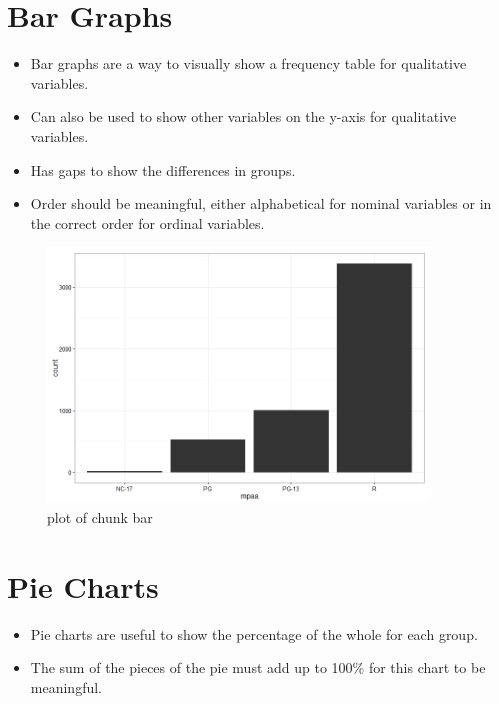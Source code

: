 \documentclass[12pt]{article}
\begin{document}
\section{Bar Graphs}\label{bar-graphs}

\begin{itemize}
\itemsep1pt\parskip0pt
\item
  Bar graphs are a way to visually show a frequency table for
  qualitative variables.
\item
  Can also be used to show other variables on the y-axis for qualitative
  variables.
\item
  Has gaps to show the differences in groups.
\item
  Order should be meaningful, either alphabetical for nominal variables
  or in the correct order for ordinal variables.
\end{itemize}

\begin{figure}[H]
\centering
\includegraphics[width=4in]{figure/bar-1.png}
\caption{plot of chunk bar}
\end{figure}

\section{Pie Charts}\label{pie-charts}

\begin{itemize}
\itemsep1pt\parskip0pt
\item
  Pie charts are useful to show the percentage of the whole for each
  group.
\item
  The sum of the pieces of the pie must add up to 100\% for this chart
  to be meaningful.
\end{itemize}
\end{document}
